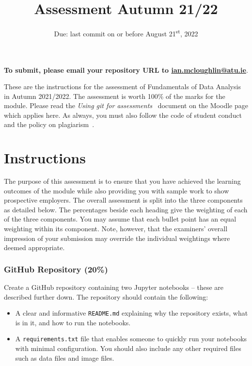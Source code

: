 \documentclass[a4paper, 12pt]{scrartcl}
\title{Assessment Autumn 21/22}
\author{}
\date{Due: last commit on or before August 21\textsuperscript{st}, 2022}
\begin{document}
  
  \maketitle
  
  \vspace{-12mm}
  \begin{center} \textbf{To submit, please email your repository URL to \url{ian.mcloughlin@atu.ie}}. \end{center}


  \noindent These are the instructions for the assessment of Fundamentals of Data Analysis in Autumn 2021/2022.
  The assessment is worth 100\% of the marks for the module.
  Please read the \emph{Using git for assessments}~\cite{usinggit} document on the Moodle page which applies here.
  As always, you must also follow the code of student conduct and the policy on plagiarism~\cite{gmitqaf}.

  \section*{Instructions}
  
  The purpose of this assessment is to ensure that you have achieved the learning outcomes of the module while also providing you with sample work to show prospective employers.
  The overall assessment is split into the three components as detailed below.
  The percentages beside each heading give the weighting of each of the three components.
  You may assume that each bullet point has an equal weighting within its component.
  Note, however, that the examiners' overall impression of your submission may override the individual weightings where deemed appropriate.

  \subsubsection*{GitHub Repository (20\%)}
  Create a GitHub repository containing two Jupyter notebooks -- these are described further down.
  The repository should contain the following:
  \begin{itemize}
    \item A clear and informative \texttt{README.md} explaining why the repository exists, what is in it, and how to run the notebooks.
    \item A \texttt{requirements.txt} file that enables someone to quickly run your notebooks with minimal configuration. You should also include any other required files such as data files and image files.
  \end{itemize}
\end{document}
